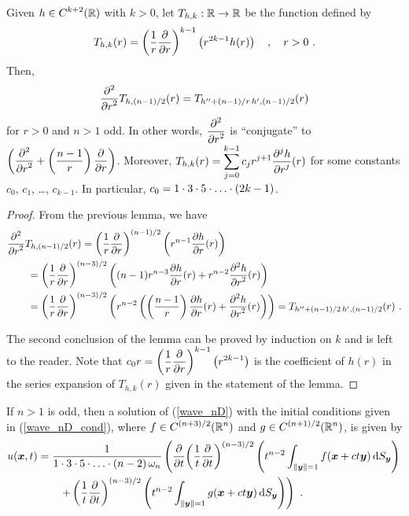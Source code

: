 \begin{lemma} \label{wave_sol_pr2}
Given $\DS h \in C^{k+2}(\RR)$ with $k>0$, let
$T_{h,k}:\RR \rightarrow \RR$ be the function defined by
\[
T_{h,k}(r) = \left(\frac{1}{r}\pdydx{}{r}\right)^{k-1}
\left(r^{2k-1} h(r)\right) \quad , \quad  r >0  \ .
\]
Then,
\[
\pdfdxn{ T_{h,(n-1)/2} }{r}{2}(r) = T_{h'' +(n-1)/r\,h',(n-1)/2}(r)
\]
for $r > 0$ and $n>1$ odd.
In other words, $\DS \pdydxn{}{r}{2}$ is ``conjugate'' to
$\DS \left(\pdydxn{}{r}{2}
+ \left(\frac{n-1}{r}\right)\pdydx{}{r}\right)$.
Moreover,
$\DS
T_{h,k}(r) = \sum_{j=0}^{k-1} c_j r^{j+1} \pdydxn{h}{r}{j}(r)$
for some constants $c_0$, $c_1$, \ldots, $c_{k-1}$.  In particular,
$\DS c_0 = 1 \cdot 3 \cdot 5 \cdot \ldots \cdot (2k-1)$.
\end{lemma}

\begin{proof}
From the previous lemma, we have
\begin{align*}
&\pdfdxn{ T_{h,(n-1)/2} }{r}{2}(r) =
\left(\frac{1}{r} \pdydx{}{r}\right)^{(n-1)/2}
\left( r^{n-1} \pdydx{h}{r}(r)\right) \\
&\qquad = \left(\frac{1}{r} \pdydx{}{r}\right)^{(n-3)/2}
\left( (n-1)r^{n-3} \pdydx{h}{r}(r) + r^{n-2} \pdydxn{h}{r}{2}(r)
\right) \\
&\qquad = \left(\frac{1}{r} \pdydx{}{r}\right)^{(n-3)/2}
\left( r^{n-2} \left( \left( \frac{n-1}{r}\right) \pdydx{h}{r}(r)
+\pdydxn{h}{r}{2}(r) \right) \right)
= T_{h''+(n-1)/2\, h', (n-1)/2}(r) \ .
\end{align*}

The second conclusion of the lemma can be proved by induction on $k$
and is left to the reader.  Note that
$\DS c_0 r = \left(\frac{1}{r}\pdydx{}{r}\right)^{k-1}
\left(r^{2k-1}\right)$ is the coefficient of $h(r)$ in the series
expansion of $T_{h,k}(r)$ given in the statement of the lemma. 
\end{proof}

\begin{theorem} \label{wave_sol_nD_odd}
If $n > 1$ is odd, then a solution of
(\ref{wave_nD}) with the initial conditions given in
(\ref{wave_nD_cond}), where $\DS f\in C^{(n+3)/2}(\RR^n)$ and
$\DS g\in C^{(n+1)/2}(\RR^n)$, is given by
\begin{equation} \label{wave_sol_nD_oddEQ}
\begin{split} 
u(\VEC{x},t) &= \frac{1}{1\cdot 3 \cdot 5 \cdot \ldots \cdot (n-2)
\,\omega_n}
\left( \pdfdx{ \left( \frac{1}{t} \pdydx{}{t} \right)^{(n-3)/2} }{t}
\left( t^{n-2} \int_{\|\VEC{y}\|=1} f(\VEC{x} + ct \VEC{y})
\dss{S}{y} \right)  \right. \\
& \qquad \left. + \left( \frac{1}{t} \pdydx{}{t} \right)^{(n-3)/2}
\left( t^{n-2} \int_{\|\VEC{y}\|=1} g(\VEC{x}+ ct \VEC{y})
\dss{S}{y} \right) \right) \ .
\end{split}
\end{equation}
\end{theorem}

